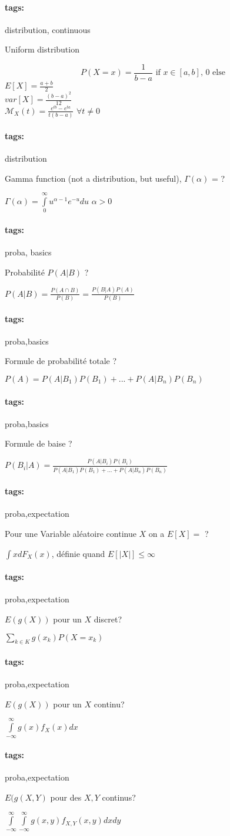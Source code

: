 \documentclass[12pt]{article}
\newcommand*{\xfield}[1]{\begin{mdframed}\centering #1\end{mdframed}\bigskip}
\newenvironment{note}{}{}
\newcommand*{\tags}[1]{\paragraph{tags: }#1}
\begin{document}
\begin{note}
\tags{distribution, continuous}
\xfield{Uniform distribution}
\xfield{$$P(X = x) = \frac{1}{b-a}\text{ if $x \in [a,b]$, $0$ else}$$
$E[X] = \frac{a+b}{2}$\\
$var[X] = \frac{(b-a)^2}{12}$\\
$\mathcal{M}_X(t) = \frac{e^{tb}-e^{ta}}{t(b-a)}$ $\forall t \neq 0$}
\end{note}

\begin{note}
\tags{distribution}
\xfield{Gamma function (not a distribution, but useful), $\Gamma(\alpha)$ = ?}
\xfield{$\Gamma(\alpha) = \int\limits_0^{\infty} u^{\alpha -1}e^{-u}du$ $\alpha >0$}
\end{note}

\begin{note}
	\tags{proba, basics}
	\xfield{Probabilité $P(A | B)$ ?}
	\xfield{$P(A | B) = \frac{P(A \cap B)}{P(B)} = \frac{P(B | A)P(A)}{P(B)}$}
\end{note}

\begin{note}
	\tags{proba,basics}
	\xfield{Formule de probabilité totale ?}
	\xfield{$P(A) = P(A | B_1)P(B_1)+...+P(A | B_n)P(B_n)$}
\end{note}

\begin{note}
	\tags{proba,basics}
	\xfield{Formule de baise ?}
	\xfield{$P(B_i | A) = \frac{P(A | B_i)P(B_i)}{P(A | B_1)P(B_1) + ... + P(A | B_n)P(B_n)}$}
\end{note}

\begin{note}
	\tags{proba,expectation}
	\xfield{Pour une Variable aléatoire continue $X$ on a $E[X] =$ ?}
	\xfield{$\int xdF_X(x)$, définie quand $E[|X|] \leq \infty $}
\end{note}

\begin{note}
	\tags{proba,expectation}
	\xfield{$E(g(X))$ pour un $X$ discret?}
	\xfield{$\sum \limits_{k \in K} g(x_k)P(X = x_k)$}
\end{note}

\begin{note}
	\tags{proba,expectation}
	\xfield{$E(g(X))$ pour un $X$ continu?}
	\xfield{$\int \limits_{-\infty}^{\infty} g(x)f_X(x)dx$}
\end{note}

\begin{note}
	\tags{proba,expectation}
	\xfield{$E(g(X,Y)$ pour des $X,Y$ continus?}
	\xfield{$\int \limits_{-\infty}^{\infty} \int \limits_{-\infty}^{\infty} g(x,y)f_{X,Y}(x,y)dxdy$}
\end{note}
\end{document}
